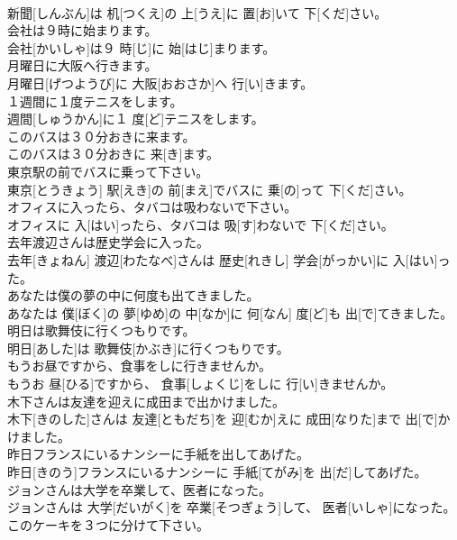 \documentclass[8pt]{extreport}
\begin{document}
\begin{CJK}{UTF8}{min}
\\	新聞[しんぶん]は 机[つくえ]の 上[うえ]に 置[お]いて 下[くだ]さい。	
\\	会社は９時に始まります。	
\\	会社[かいしゃ]は９ 時[じ]に 始[はじ]まります。	
\\	月曜日に大阪へ行きます。	
\\	月曜日[げつようび]に 大阪[おおさか]へ 行[い]きます。	
\\	１週間に１度テニスをします。	
\\	週間[しゅうかん]に１ 度[ど]テニスをします。	
\\	このバスは３０分おきに来ます。	
\\	このバスは３０分おきに 来[き]ます。	
\\	東京駅の前でバスに乗って下さい。	
\\	東京[とうきょう] 駅[えき]の 前[まえ]でバスに 乗[の]って 下[くだ]さい。	
\\	オフィスに入ったら、タバコは吸わないで下さい。	
\\	オフィスに 入[はい]ったら、タバコは 吸[す]わないで 下[くだ]さい。	
\\	去年渡辺さんは歴史学会に入った。	
\\	去年[きょねん] 渡辺[わたなべ]さんは 歴史[れきし] 学会[がっかい]に 入[はい]った。	
\\	あなたは僕の夢の中に何度も出てきました。	
\\	あなたは 僕[ぼく]の 夢[ゆめ]の 中[なか]に 何[なん] 度[ど]も 出[で]てきました。	
\\	明日は歌舞伎に行くつもりです。	
\\	明日[あした]は 歌舞伎[かぶき]に行くつもりです。	
\\	もうお昼ですから、食事をしに行きませんか。	
\\	もうお 昼[ひる]ですから、 食事[しょくじ]をしに 行[い]きませんか。	
\\	木下さんは友達を迎えに成田まで出かけました。	
\\	木下[きのした]さんは 友達[ともだち]を 迎[むか]えに 成田[なりた]まで 出[で]かけました。	
\\	昨日フランスにいるナンシーに手紙を出してあげた。	
\\	昨日[きのう]フランスにいるナンシーに 手紙[てがみ]を 出[だ]してあげた。	
\\	ジョンさんは大学を卒業して、医者になった。	
\\	ジョンさんは 大学[だいがく]を 卒業[そつぎょう]して、 医者[いしゃ]になった。	
\\	このケーキを３つに分けて下さい。	

\end{CJK}
\end{document}
